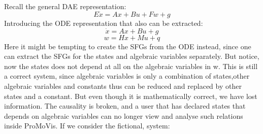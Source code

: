 Recall the general DAE representation:
\begin{equation}
E\dot{x} = Ax + Bu + Fw + g
\end{equation}Introducing the ODE representation that also can be extracted:
\begin{equation}
\dot{x} = Ax + Bu + g
\end{equation}
\begin{equation}
w  = Hx + Mu + q
\end{equation} Here it might be tempting to create the SFGs from the ODE instead, since one can extract the SFGs  for the states and algebraic variables separately. But notice, now the states does not depend at all on the algebraic variables in w. This is still a correct system, since algebraic variables is only a combination of states,other algebraic variables and constants thus can be reduced and replaced by other states and a constant. But even though it is mathematically correct, we have lost information. The causality is broken, and a user that has declared states that depends on algebraic variables can no longer view and analyse such relations inside ProMoVis. If we consider the fictional, system:

